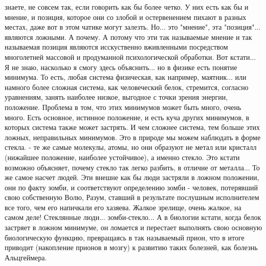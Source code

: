 знаете, не совсем так, если говорить как бы более четко. У них есть как бы и
мнение, и позиция, которое они со злобой и остервенением пихают в разных
местах, даже вот в этом чатике могут залезть. Но... это "мнение", эта
"позиция"... являются ложными. А почему. А потому что эти так называемые мнение
и так называемая позиция являются исскуственно вживленными посредством
многолетней массовой и продуманной психологической обработки. Вот кстати... Я
не знаю, насколько я смогу здесь объяснить... но в физике есть понятие
минимума. То есть, любая система физическая, как например, маятник... или
намного более сложная система, как человеческий белок, стремится, согласно
уравнениям, занять наиболее низкое, выгодное с точки зрения энергии, положение.
Проблема в том, что этих минимумов может быть много, очень много. Есть
основное, истинное положение, и есть куча других минимумов, в которых система
также может застрять. И чем сложнее система, тем больше этих ложных,
неправильных минимумов. Это в природе мы можем наблюдать в форме стекла. - те
же самые молекулы, атомы, но они образуют не метал или кристалл (нижайшее
положение, наиболее устойчивое), а именно стекло. Это кстати возможно
объясняет, почему стекло так легко разбить, в отличие от металла... То же самое
насчет людей. Эти внешне как бы люди застряли в ложном положении, они по факту
зомби, и соответствуют определению зомби - человек, потерявший свою собственную
Волю, Разум, ставший в результате послушным исполнителем все того, чем его
напичкали его хазяева. Жалкое зрелище, очень жалкое, на самом деле! Стеклянные
люди... зомби-стекло... А в биологии кстати, когда белок застряет в ложном
минимуме, он ломается и перестает выполнять свою основную биологическую
функцию, превращаясь в так называемый прион, что в итоге приводит (накопление
прионов в мозгу) к развитию таких болезней, как болезнь Альцгеймера.

